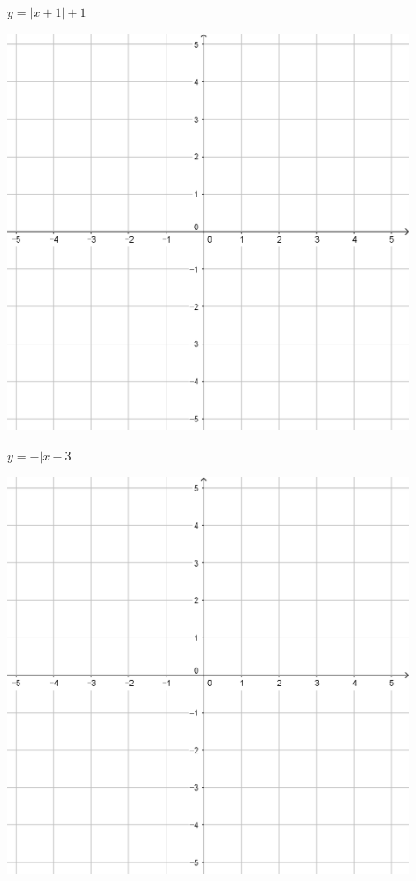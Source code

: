 \documentclass{oblivoir}
\begin{document}
\begin{minipage}{0.45\textwidth}\centering
\(y=|x+1|+1\)
\par\bigskip\includegraphics[width=0.9\textwidth]{55}
\end{minipage}
\begin{minipage}{0.45\textwidth}\centering
\(y=-|x-3|\)
\par\bigskip\includegraphics[width=0.9\textwidth]{55}
\end{minipage}\bigskip\bigskip\par
\end{document}
